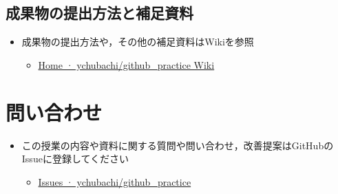 \documentclass[a4paper,twoside,twocolumn]{bxjsarticle}
\begin{document}
\subsection{成果物の提出方法と補足資料}
\label{sec-5-3}
\begin{itemize}
\item 成果物の提出方法や，その他の補足資料はWikiを参照
\begin{itemize}
\item \href{https://github.com/ychubachi/github_practice/wiki}{Home · ychubachi/github\_practice Wiki}
\end{itemize}
\end{itemize}

\section{問い合わせ}
\label{sec-6}
\begin{itemize}
\item この授業の内容や資料に関する質問や問い合わせ，改善提案はGitHubのIssueに登録してください
\begin{itemize}
\item \href{https://github.com/ychubachi/github_practice/issues}{Issues · ychubachi/github\_practice}
\end{itemize}
\end{itemize}
\end{document}
